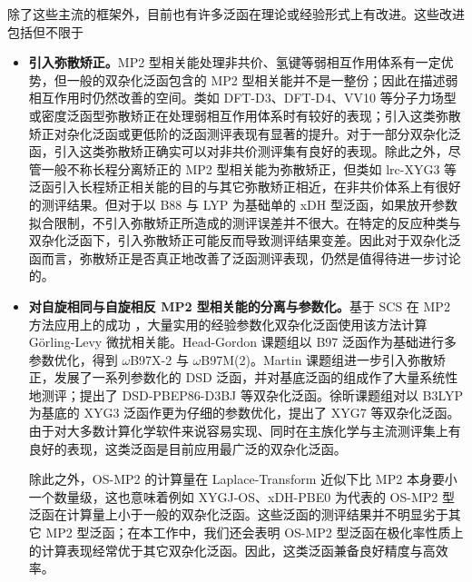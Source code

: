 除了这些主流的框架外，目前也有许多泛函在理论或经验形式上有改进。这些改进包括但不限于
\begin{itemize}[nosep]
  \item \textbf{引入弥散矫正。}MP2 型相关能处理非共价、氢键等弱相互作用体系有一定优势，但一般的双杂化泛函包含的 MP2 型相关能并不是一整份；因此在描述弱相互作用时仍然改善的空间。类如 DFT-D3\cite{Grimme-Goerigk.JCC.2011, Smith-Sherrill.JPCL.2016}、DFT-D4\cite{Caldeweyher-Grimme.JCP.2019}、VV10\cite{Vydrov-VanVoorhis.JCP.2010} 等分子力场型或密度泛函型弥散矫正在处理弱相互作用体系时有较好的表现；引入这类弥散矫正对杂化泛函或更低阶的泛函测评表现有显著的提升\cite{Goerigk-Grimme.PCCP.2017}。对于一部分双杂化泛函，引入这类弥散矫正确实可以对非共价测评集有良好的表现\cite{Grimme-Goerigk.JCC.2011, Santra-Martin.JPCA.2019}。除此之外，尽管一般不称长程分离矫正的 MP2 型相关能为弥散矫正，但类如 lrc-XYG3 等泛函引入长程矫正相关能的目的与其它弥散矫正相近，在非共价体系上有很好的测评结果\cite{Zhang-Xu.JPCL.2013}。但对于以 B88 与 LYP 为基础单的 xDH 型泛函，如果放开参数拟合限制，不引入弥散矫正所造成的测评误差并不很大\cite{Zhang-Xu.JPCL.2021, Santra-Martin.JPCL.2021}。在特定的反应种类与双杂化泛函下，引入弥散矫正可能反而导致测评结果变差\cite{Bremond-Adamo.JCP.2022}。因此对于双杂化泛函而言，弥散矫正是否真正地改善了泛函测评表现，仍然是值得待进一步讨论的。
  
  \item \textbf{对自旋相同与自旋相反 MP2 型相关能的分离与参数化。}基于 SCS 在 MP2 方法应用上的成功 \cite{Grimme-Grimme.JCP.2003}，大量实用的经验参数化双杂化泛函使用该方法计算 G\"{o}rling-Levy 微扰相关能。Head-Gordon 课题组以 B97 泛函作为基础进行多参数优化，得到 $\omega$B97X-2\cite{Chai-Head-Gordon.JCP.2009} 与 $\omega$B97M(2)\cite{Mardirossian-Head-Gordon.JCP.2018}。Martin 课题组进一步引入弥散矫正，发展了一系列参数化的 DSD 泛函，并对基底泛函的组成作了大量系统性地测评；提出了 DSD-PBEP86-D3BJ\cite{Kozuch-Martin.JCC.2013} 等双杂化泛函。徐昕课题组对以 B3LYP 为基底的 XYG3 泛函作更为仔细的参数优化，提出了 XYG7\cite{Zhang-Xu.JPCL.2021} 等双杂化泛函。由于对大多数计算化学软件来说容易实现、同时在主族化学与主流测评集上有良好的表现，这类泛函是目前应用最广泛的双杂化泛函。
  
  除此之外，OS-MP2 的计算量在 Laplace-Transform 近似下比 MP2 本身要小一个数量级\cite{Almloef-Almloef.CPL.1991}，这也意味着例如 XYGJ-OS\cite{Zhang-Goddard.PNAS.2011}、xDH-PBE0\cite{Zhang-Xu.JCP.2012} 为代表的 OS-MP2 型泛函在计算量上小于一般的双杂化泛函。这些泛函的测评结果并不明显劣于其它 MP2 型泛函；在本工作中，我们还会表明 OS-MP2 型泛函在极化率性质上的计算表现经常优于其它双杂化泛函。因此，这类泛函兼备良好精度与高效率。
  

\end{itemize}
